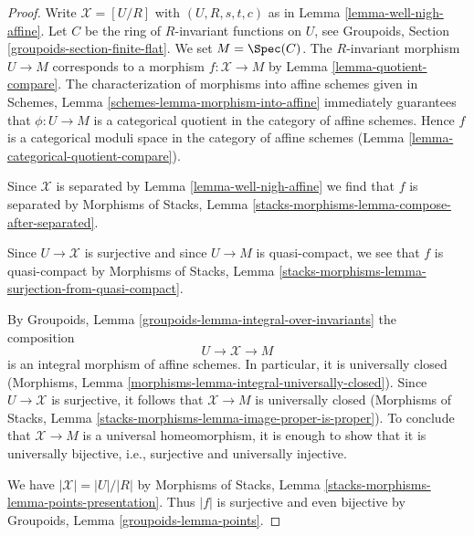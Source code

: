 \begin{proof}
Write $\mathcal{X} = [U/R]$ with $(U, R, s, t, c)$ as in
Lemma \ref{lemma-well-nigh-affine}. Let $C$ be the ring of
$R$-invariant functions on $U$, see
Groupoids, Section \ref{groupoids-section-finite-flat}.
We set $M = \Spec(C)$. The $R$-invariant morphism
$U \to M$ corresponds to a morphism $f : \mathcal{X} \to M$ by
Lemma \ref{lemma-quotient-compare}.
The characterization of morphisms into affine schemes given in
Schemes, Lemma \ref{schemes-lemma-morphism-into-affine}
immediately guarantees that $\phi : U \to M$ is a categorical
quotient in the category of affine schemes. Hence $f$ is a
categorical moduli space in the category of affine schemes
(Lemma \ref{lemma-categorical-quotient-compare}).

\medskip\noindent
Since $\mathcal{X}$ is separated by Lemma \ref{lemma-well-nigh-affine}
we find that $f$ is separated by Morphisms of Stacks, Lemma
\ref{stacks-morphisms-lemma-compose-after-separated}.

\medskip\noindent
Since $U \to \mathcal{X}$ is surjective and since $U \to M$ is quasi-compact,
we see that $f$ is quasi-compact by Morphisms of Stacks, Lemma
\ref{stacks-morphisms-lemma-surjection-from-quasi-compact}.

\medskip\noindent
By Groupoids, Lemma \ref{groupoids-lemma-integral-over-invariants}
the composition
$$
U \to \mathcal{X} \to M
$$
is an integral morphism of affine schemes. In particular, it is
universally closed
(Morphisms, Lemma \ref{morphisms-lemma-integral-universally-closed}).
Since $U \to \mathcal{X}$ is surjective, it follows that $\mathcal{X} \to M$
is universally closed (Morphisms of Stacks, Lemma
\ref{stacks-morphisms-lemma-image-proper-is-proper}).
To conclude that $\mathcal{X} \to M$ is a universal homeomorphism,
it is enough to show that it is universally bijective, i.e.,
surjective and universally injective.

\medskip\noindent
We have $|\mathcal{X}| = |U|/|R|$ by
Morphisms of Stacks, Lemma \ref{stacks-morphisms-lemma-points-presentation}.
Thus $|f|$ is surjective and even bijective
by Groupoids, Lemma \ref{groupoids-lemma-points}.


\end{proof}

